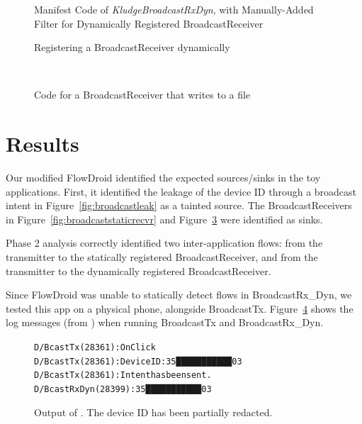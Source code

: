 \begin{figure}[!h]
\begin{framed}

\caption{Manifest Code of \emph{KludgeBroadcastRxDyn}, with Manually-Added Filter for Dynamically Registered BroadcastReceiver}
\label{fig:broadcastDynManifestKludge}
\end{framed}
\end{figure}

\begin{figure}[!h]
\begin{framed}

\caption{Registering a BroadcastReceiver dynamically}
\label{fig:broadcastregister}
\end{framed}
\end{figure}

\
\begin{figure}[!h]
\begin{framed}

\caption{Code for a BroadcastReceiver that writes to a file}
\label{fig:broadcastdynrecvr}
\end{framed}
\end{figure}

\section{Results}

Our modified FlowDroid identified the expected sources/sinks in the toy applications. First, it identified the leakage of the device ID through a broadcast intent in Figure~\ref{fig:broadcastleak} as a tainted source. The BroadcastReceivers in Figure~\ref{fig:broadcaststaticrecvr} and Figure~\ref{fig:broadcastdynrecvr} were identified as sinks.

Phase 2 analysis correctly identified two inter-application flows: from the transmitter to the statically registered BroadcastReceiver, and from the transmitter to the dynamically registered BroadcastReceiver.

Since FlowDroid was unable to statically detect flows in BroadcastRx\_Dyn, we tested this app on a physical phone, alongside BroadcastTx. Figure~\ref{fig:logcat-BcastDyn} shows the log messages (from ) when running BroadcastTx and BroadcastRx\_Dyn.

\begin{figure}[!h]
\begin{framed}
\begin{alltt}
D/BcastTx (28361): OnClick
D/BcastTx (28361): DeviceID: 35███████████03
D/BcastTx (28361): Intent has been sent.
D/BcastRxDyn(28399): 35███████████03
\end{alltt}
\caption[Output of ]{Output of .  The device ID has been partially redacted.}
\label{fig:logcat-BcastDyn}
\end{framed}
\end{figure}

